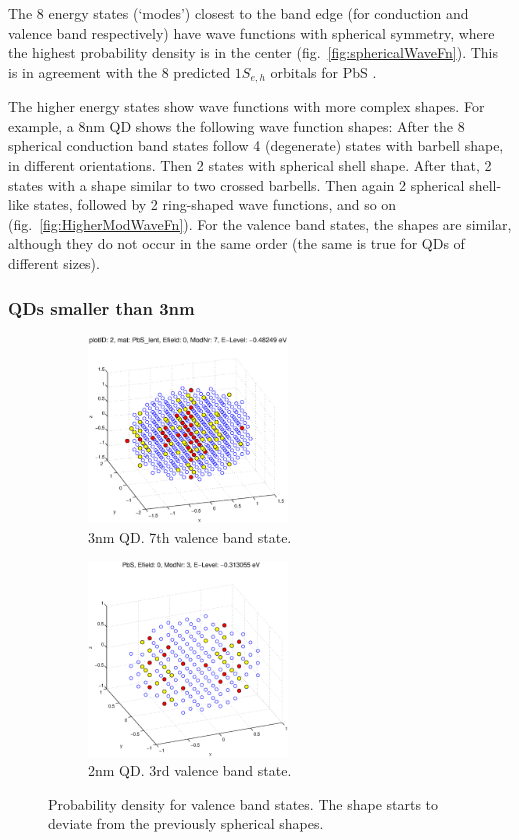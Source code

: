 The 8 energy states (`modes') closest to the band edge (for conduction and valence band respectively) have wave functions with spherical symmetry, where the highest probability density is in the center (fig.~\ref{fig:sphericalWaveFn}). This is in agreement with the 8 predicted $1S_{e,h}$ orbitals for PbS \cite[p.410]{Talapin}.
	
The higher energy states show wave functions with more complex shapes. For example, a 8nm QD shows the following wave function shapes: After the 8 spherical conduction band states follow 4 (degenerate) states with barbell shape, in different orientations. Then 2 states with spherical shell shape. After that, 2 states with a shape similar to two crossed barbells. Then again 2 spherical shell-like states, followed by 2 ring-shaped wave functions, and so on (fig.~\ref{fig:HigherModWaveFn}). For the valence band states, the shapes are similar, although they do not occur in the same order (the same is true for QDs of different sizes).

\subsubsection{QDs smaller than 3nm}	

\begin{figure}
	\centering
	\begin{subfigure}{200px}
		\includegraphics[width=200px]{Fig/Plots/r15VBmod7}
		\caption{3nm QD. 7th valence band state.}
	\end{subfigure}
	\begin{subfigure}{200px}
		\includegraphics[width=200px]{Fig/Plots/r1VBmod3}
		\caption{2nm QD. 3rd valence band state.}
	\end{subfigure}
	\caption{Probability density for valence band states. The shape starts to deviate from the previously spherical shapes.}
	\label{fig:asymWaveFn}
\end{figure}


